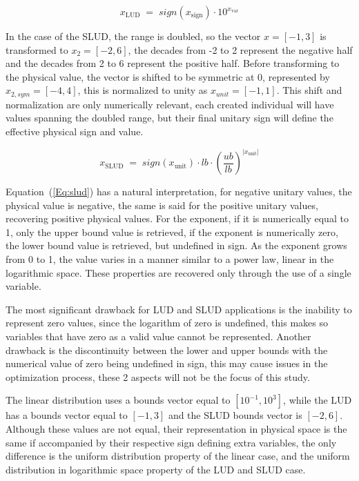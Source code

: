 \documentclass[10pt,fleqn,a4paper,twoside]{article}
\begin{document}
\begin{equation}
    x_{\mathrm{LUD}}\;=\;   sign(x_{\mathrm{sign}})\cdot 10^{x_{\mathrm{var}}}
    \label{Eq:lud}
\end{equation}

In the case of the SLUD, the range is doubled, so the vector $x=[-1,3]$ is transformed to $x_2=[-2,6]$, the decades from -2 to 2 represent the negative half and the decades from 2 to 6 represent the positive half.
Before transforming to the physical value, the vector is shifted to be symmetric at 0, represented by $x_{2,sym}=[-4,4]$, this is normalized to unity as $x_{unit}=[-1,1]$. This shift and normalization are only numerically relevant, each created
individual will have values spanning the doubled range, but their final unitary sign will define the effective physical sign and value. 

\begin{equation}
    x_{\mathrm{SLUD}}\;=\; sign(x_{\mathrm{unit}}) \cdot lb \cdot  \left(\frac{ub}{lb}\right)^{| x_{\mathrm{unit}}|}
    \label{Eq:slud}
\end{equation}

Equation~(\ref{Eq:slud}) has a natural interpretation, for negative unitary values, the physical value is negative, the same is said for the positive unitary values, recovering positive physical values.
For the exponent, if it is numerically equal to 1, only the upper bound value is retrieved, if the exponent is numerically zero, the lower bound value is retrieved, 
but undefined in sign. As the exponent grows from 0 to 1, the value varies in a manner similar to a power law, linear in the logarithmic space. These properties are recovered only through the use 
of a single variable.

The most significant drawback for LUD and SLUD applications is the inability to represent zero values, since the logarithm of zero
is undefined, this makes so variables that have zero as a valid value cannot be represented. Another drawback
is the discontinuity between the lower and upper bounds with the numerical value of zero being undefined in sign,
this may cause issues in the optimization process, these 2 aspects will not be the focus of this study.



The linear distribution uses a bounds vector equal to $[10^{-1}, 10^{3}]$, while the LUD has a bounds vector equal to $[-1,3]$ and the SLUD bounds vector is $[-2,6]$. Although these values are not 
equal, their representation in physical space is the same if accompanied by their respective sign defining extra variables, the only difference is the uniform distribution property of the linear case, and
the uniform distribution in logarithmic space property of the LUD and SLUD case.
\end{document}
